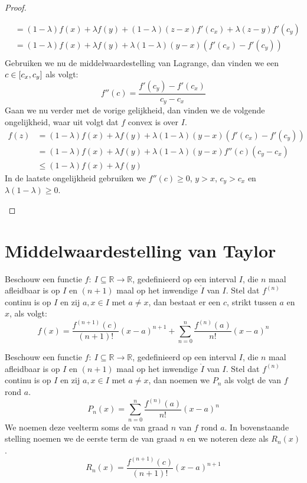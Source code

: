 \documentclass[main.tex]{subfiles}
\begin{document}
\begin{bpr}
\begin{proof}
\begin{itemize}
\[\begin{array}{rl}
        &= (1-\lambda)f(x) + \lambda f(y) + (1-\lambda)(z-x)f'(c_{x}) + \lambda(z-y)f'(c_{y})\\
        &= (1-\lambda)f(x) + \lambda f(y) + \lambda(1-\lambda)(y-x)(f'(c_{x})-f'(c_{y}))\\
      \end{array}
      \]
      Gebruiken we nu de middelwaardestelling van Lagrange, dan vinden we een $c \in \interval{c_{x}}{c_{y}}$ als volgt:
      \[ f''(c) = \frac{f'(c_{y})-f'(c_{x})}{c_{y}-c_{x}} \]
      Gaan we nu verder met de vorige gelijkheid, dan vinden we de volgende ongelijkheid, waar uit volgt dat $f$ convex is over $I$.
      \[ 
      \begin{array}{rl}
        f(z) &= (1-\lambda)f(x) + \lambda f(y) + \lambda(1-\lambda)(y-x)(f'(c_{x})-f'(c_{y}))\\
             &= (1-\lambda)f(x) + \lambda f(y) + \lambda(1-\lambda)(y-x)f''(c)(c_{y}-c_{x})\\
             &\le (1-\lambda)f(x) + \lambda f(y) 
      \end{array}
      \]
      In de laatste ongelijkheid gebruiken we $f''(c) \ge 0$, $y > x$, $c_{y}> c_{x}$ en $\lambda(1-\lambda) \ge 0$.
    \end{itemize}
  \end{proof}
\end{bpr}

\section{Middelwaardestelling van Taylor}
\label{sec:midd-van-tayl}

\begin{bst}
  Beschouw een functie $f:\ I \subseteq \mathbb{R} \rightarrow \mathbb{R}$, gedefinieerd op een interval $I$, die $n$ maal afleidbaar is op $I$ en $(n+1)$ maal op het inwendige $\mathring{I}$ van $I$.
  Stel dat $f^{(n)}$ continu is op $I$ en zij $a,x\in I$ met $a \neq x$, dan bestaat er een $c$, strikt tussen $a$ en $x$, als volgt:
  \[ 
  f(x) = \frac{f^{(n+1)}(c)}{(n+1)!}(x-a)^{n+1} + \sum_{n = 0}^{n}\frac{f^{(n)}(a)}{n!}(x-a)^{n} 
  \]
\end{bst}

\begin{de}
  Beschouw een functie $f:\ I \subseteq \mathbb{R} \rightarrow \mathbb{R}$, gedefinieerd op een interval $I$, die $n$ maal afleidbaar is op $I$ en $(n+1)$ maal op het inwendige $\mathring{I}$ van $I$.
  Stel dat $f^{(n)}$ continu is op $I$ en zij $a,x\in I$ met $a \neq x$, dan noemen we $P_{n}$ als volgt de  van $f$ rond $a$.
  \[ 
  P_{n}(x) = \sum_{n = 0}^{n}\frac{f^{(n)}(a)}{n!}(x-a)^{n} 
  \]
  We noemen deze veelterm soms de  van graad $n$ van $f$ rond $a$.
  In bovenstaande stelling noemen we de eerste term de  van graad $n$ en we noteren deze als $R_{n}(x)$.
  \[ 
  R_{n}(x) = \frac{f^{(n+1)}(c)}{(n+1)!}(x-a)^{n+1} 
  \]
\end{de}
\end{document}
